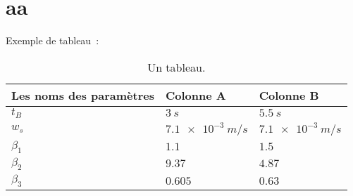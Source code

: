 \documentclass[a4paper]{article}
\begin{document}
\section{aa} %
Exemple de tableau~:
\begin{table}
\centering
\begin{tabular}{ | >{\centering\arraybackslash}m{} | >{\centering\arraybackslash}m{} | >{\centering\arraybackslash}m{} | }
	\hline
	\centering  Les noms des paramètres & Colonne A & Colonne B \\
	\hline
	$t_B$ & $\SI{3}{s}$ & $\SI{5.5}{s}$ \\
	\hline
	$w_s$ & $\SI{7.1e-3}{m/s}$ & $\SI{7.1e-3}{m/s}$ \\
	\hline
	$\beta_1$ & $1.1$ & $1.5$ \\
	\hline
	$\beta_2$ & $9.37$ & $4.87$ \\
	\hline
	$\beta_3$ & $\num{0.605}$ & $\num{0.63}$ \\
	\hline
\end{tabular}
\caption{Un tableau.}
\label{ta:res:param}
\end{table}



\listoftables
\listoffigures
\end{document}
